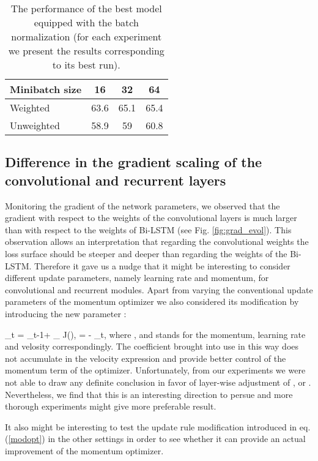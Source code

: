\documentclass[a4paper]{article}
\newcommand{\beq}{}
\newcommand{\bs}{\boldsymbol}  \newcommand{\theHalgorithm}{\arabic{algorithm}}
\begin{document}
\begin{table}[!htb]
\caption{The performance of the best model equipped with the batch normalization (for each experiment we present the results corresponding to its best run).}
\label{table-batchnorm}
\centering
\begin{tabular}{lccc}
\toprule
Minibatch size & 16 & 32 & 64\\
\midrule
Weighted & 63.6 & 65.1 & 65.4\\
Unweighted & 58.9 & 59 & 60.8\\
\bottomrule
\end{tabular}
\end{table}


\subsection{Difference in the gradient scaling of the convolutional and recurrent layers}
\label{lwga}

Monitoring the gradient of the network parameters, we observed that the gradient with respect to the weights of the convolutional layers is much larger than with respect to the weights of Bi-LSTM (see Fig. \ref{fig:grad_evol}). This observation allows an interpretation that regarding the convolutional weights the loss surface should be steeper and deeper than regarding the weights of the Bi-LSTM. Therefore it gave us a nudge that it might be interesting to consider different update parameters, namely learning rate and momentum, for convolutional and recurrent modules. 
Apart from varying the conventional update parameters of the momentum optimizer we also considered its modification by introducing the new parameter : 

\beq
\bs{v}_t = \bs{v}_{t-1}\gamma + \eta \nabla_{\bs{w}} J(\bs{w}), \quad
\bs{w} = \bs{w} - \beta \bs{v}_t,
\label{modopt}
\eeq
where ,  and  stands for the momentum, learning rate and velosity correspondingly. The coefficient  brought into use in this way does not accumulate in the velocity expression and provide better control of the momentum term of the optimizer.  
Unfortunately, from our experiments we were not able to draw any definite conclusion in favor of layer-wise adjustment of ,  or . Nevertheless, we find that this is an interesting direction to persue and more thorough experiments might give more preferable result. 

It also might be interesting to test the update rule modification introduced in eq. (\ref{modopt})
in the other settings in order to see whether it can provide an actual improvement of the momentum optimizer. 
\end{document}
